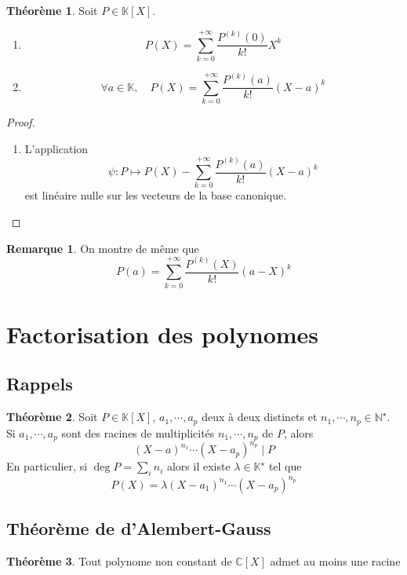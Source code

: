 \documentclass{article}
\theoremstyle{definition}
\newtheorem*{thm}{Théorème}
\newtheorem*{rem}{Remarque}
\begin{document}
\begin{thm}
    Soit $P\in\mathbb K[X]$.
    \begin{enumerate}
        \item \[
                P(X)=\sum_{k=0}^{+\infty} \frac{P^{(k)}(0)}{k!}X^k
            \]
        \item \[
                \forall a\in\mathbb K, \quad P(X)=\sum_{k=0}^{+\infty}\frac{P^{(k)}(a)}{k!}(X-a)^k
            \]
    \end{enumerate}
\end{thm}
\begin{proof} ~
    \begin{enumerate}
        \item L'application \[
                \psi: P\longmapsto P(X)-\sum_{k=0}^{+\infty}\frac{P^{(k)}(a)}{k!}(X-a)^k
            \]
            est linéaire nulle sur les vecteurs de la base canonique.
    \end{enumerate}
\end{proof}

\begin{rem}
    On montre de même que \[
        P(a)=\sum_{k=0}^{+\infty}\frac{P^{(k)}(X)}{k!}(a-X)^k
    \]
\end{rem}

\section{Factorisation des polynomes}

\subsection{Rappels}

\begin{thm}
    Soit $P\in\mathbb K[X]$, $a_1, \cdots, a_p$ deux à deux distincts et $n_1, \cdots, n_p\in\mathbb N^\star$. Si $a_1, \cdots, a_p$ sont des racines de multiplicités $n_1, \cdots, n_p$ de $P$, alors \[
        (X-a)^{n_1}\cdots (X-a_p)^{n_p}\;|\;P
    \]
    En particulier, si $\deg P=\sum_i n_i$ alors il existe $\lambda\in\mathbb K^\star$ tel que \[
        P(X)=\lambda(X-a_1)^{n_1}\cdots (X-a_p)^{n_p}
    \]
\end{thm}

\subsection{Théorème de d'Alembert-Gauss}

\begin{thm}
    Tout polynome non constant de $\mathbb C[X]$ admet au moins une racine
\end{thm}
\end{document}
